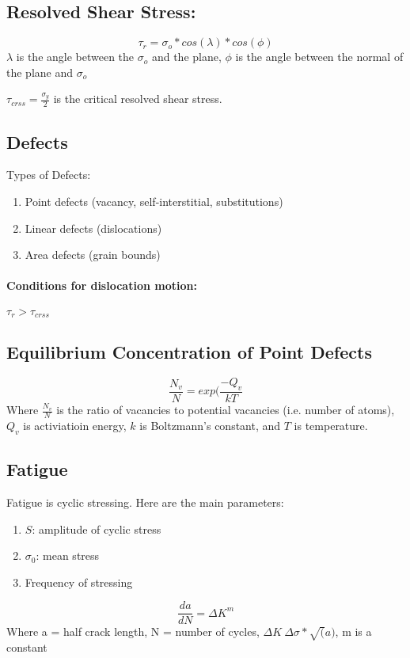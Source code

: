 \documentclass[a4paper,12pt]{report}
\begin{document}
\subsection{Resolved Shear Stress: }
$$\tau_r = \sigma_o*cos(\lambda)*cos(\phi)$$
$\lambda$ is the angle between the $\sigma_o$ and the plane, $\phi$ is the angle between the normal of the plane and ${\sigma}_o$

$\tau_{crss} = \frac{\sigma_{y}}{2}$ is the critical resolved shear stress.

\subsection{Defects}
Types of Defects:
\begin{enumerate}
\item Point defects (vacancy, self-interstitial, substitutions)
\item Linear defects (dislocations)
\item Area defects (grain bounds)
\end{enumerate}

\paragraph{Conditions for dislocation motion: } $\tau_r > \tau_{crss}$

\subsection{Equilibrium Concentration of Point Defects}
$$\frac{N_v}{N} = exp(\frac{-Q_v}{kT}$$ Where $\frac{N_v}{N}$ is the ratio of vacancies to potential vacancies (i.e. number of atoms), $Q_v$ is activiatioin energy, $k$ is Boltzmann's constant, and $T$ is temperature.

\subsection{Fatigue}
Fatigue is cyclic stressing. Here are the main parameters:
\begin{enumerate}
\item $S$: amplitude of cyclic stress
\item $\sigma_0$: mean stress
\item Frequency of stressing
\end{enumerate}

$$\frac{da}{dN} = \Delta K^{m}$$
Where a = half crack length, N = number of cycles, $\Delta K ~ \Delta \sigma * \sqrt(a)$, m is a constant
\end{document}
